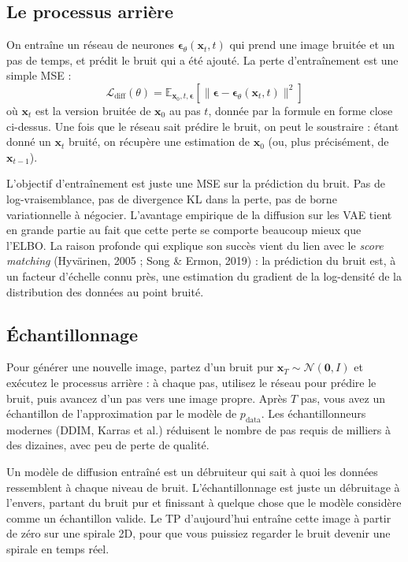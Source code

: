 \subsection{Le processus arrière}

On entraîne un réseau de neurones $\bm{\epsilon}_\theta(\bm{x}_t, t)$ qui prend une image bruitée et un pas de temps, et prédit le bruit qui a été ajouté. La perte d'entraînement est une simple MSE :
\[
\mathcal{L}_{\text{diff}}(\theta) = \mathbb{E}_{\bm{x}_0, t, \bm{\epsilon}} \!\left[ \|\bm{\epsilon} - \bm{\epsilon}_\theta(\bm{x}_t, t)\|^2 \right]
\]
où $\bm{x}_t$ est la version bruitée de $\bm{x}_0$ au pas $t$, donnée par la formule en forme close ci-dessus. Une fois que le réseau sait prédire le bruit, on peut le soustraire : étant donné un $\bm{x}_t$ bruité, on récupère une estimation de $\bm{x}_0$ (ou, plus précisément, de $\bm{x}_{t-1}$).

\begin{aitip}
L'objectif d'entraînement est juste une MSE sur la prédiction du bruit. Pas de log-vraisemblance, pas de divergence KL dans la perte, pas de borne variationnelle à négocier. L'avantage empirique de la diffusion sur les VAE tient en grande partie au fait que cette perte se comporte beaucoup mieux que l'ELBO. La raison profonde qui explique son succès vient du lien avec le \emph{score matching} (Hyvärinen, 2005 ; Song \& Ermon, 2019) : la prédiction du bruit est, à un facteur d'échelle connu près, une estimation du gradient de la log-densité de la distribution des données au point bruité.
\end{aitip}

\subsection{Échantillonnage}

Pour générer une nouvelle image, partez d'un bruit pur $\bm{x}_T \sim \mathcal{N}(\bm{0}, I)$ et exécutez le processus arrière : à chaque pas, utilisez le réseau pour prédire le bruit, puis avancez d'un pas vers une image propre. Après $T$ pas, vous avez un échantillon de l'approximation par le modèle de $p_{\text{data}}$. Les échantillonneurs modernes (DDIM, Karras et al.) réduisent le nombre de pas requis de milliers à des dizaines, avec peu de perte de qualité.

\begin{intuition}
Un modèle de diffusion entraîné est un débruiteur qui sait à quoi les données ressemblent à chaque niveau de bruit. L'échantillonnage est juste un débruitage à l'envers, partant du bruit pur et finissant à quelque chose que le modèle considère comme un échantillon valide. Le TP d'aujourd'hui entraîne cette image à partir de zéro sur une spirale 2D, pour que vous puissiez regarder le bruit devenir une spirale en temps réel.
\end{intuition}

